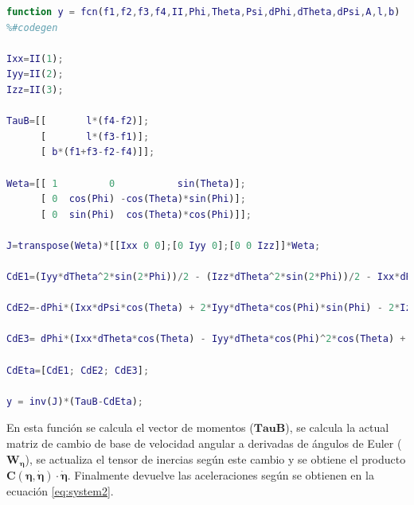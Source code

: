 \documentclass[twoside,11pt]{book}
\begin{document}
\singlespacing
\begin{lstlisting}[language=Matlab]
function y = fcn(f1,f2,f3,f4,II,Phi,Theta,Psi,dPhi,dTheta,dPsi,A,l,b)
%#codegen

Ixx=II(1);
Iyy=II(2);
Izz=II(3);
 
TauB=[[       l*(f4-f2)];
      [       l*(f3-f1)];
      [ b*(f1+f3-f2-f4)]];  

Weta=[[ 1         0           sin(Theta)];
      [ 0  cos(Phi) -cos(Theta)*sin(Phi)];
      [ 0  sin(Phi)  cos(Theta)*cos(Phi)]];
 
J=transpose(Weta)*[[Ixx 0 0];[0 Iyy 0];[0 0 Izz]]*Weta;  

CdE1=(Iyy*dTheta^2*sin(2*Phi))/2 - (Izz*dTheta^2*sin(2*Phi))/2 - Ixx*dPsi*dTheta*cos(Theta) - (Iyy*dPsi^2*sin(2*Phi)*cos(Theta)^2)/2 + (Izz*dPsi^2*sin(2*Phi)*cos(Theta)^2)/2 - Iyy*dPsi*dTheta*cos(2*Phi)*cos(Theta) + Izz*dPsi*dTheta*cos(2*Phi)*cos(Theta);

CdE2=-dPhi*(Ixx*dPsi*cos(Theta) + 2*Iyy*dTheta*cos(Phi)*sin(Phi) - 2*Izz*dTheta*cos(Phi)*sin(Phi) + Iyy*dPsi*cos(Phi)^2*cos(Theta) - Izz*dPsi*cos(Phi)^2*cos(Theta) - Iyy*dPsi*cos(Theta)*sin(Phi)^2 + Izz*dPsi*cos(Theta)*sin(Phi)^2)  - Ixx*dPsi^2*cos(Theta)*sin(Theta) + Iyy*dPsi^2*cos(Theta)*sin(Phi)^2*sin(Theta) + Izz*dPsi^2*cos(Phi)^2*cos(Theta)*sin(Theta);

CdE3= dPhi*(Ixx*dTheta*cos(Theta) - Iyy*dTheta*cos(Phi)^2*cos(Theta) + Izz*dTheta*cos(Phi)^2*cos(Theta) + Iyy*dTheta*cos(Theta)*sin(Phi)^2 - Izz*dTheta*cos(Theta)*sin(Phi)^2 + 2*Iyy*dPsi*cos(Phi)*cos(Theta)^2*sin(Phi) - 2*Izz*dPsi*cos(Phi)*cos(Theta)^2*sin(Phi)) + Iyy*dTheta^2*cos(Phi)*sin(Phi)*sin(Theta) - Izz*dTheta^2*cos(Phi)*sin(Phi)*sin(Theta) + 2*Ixx*dPsi*dTheta*cos(Theta)*sin(Theta) - 2*Izz*dPsi*dTheta*cos(Phi)^2*cos(Theta)*sin(Theta) - 2*Iyy*dPsi*dTheta*cos(Theta)*sin(Phi)^2*sin(Theta);

CdEta=[CdE1; CdE2; CdE3];

y = inv(J)*(TauB-CdEta);
\end{lstlisting}
\onehalfspacing

En esta función se calcula el vector de momentos ($\mathbf{TauB}$), se calcula la actual matriz de cambio de base de velocidad angular a derivadas de ángulos de Euler ($\pmb{W_\eta}$), se actualiza el tensor de inercias según este cambio y se obtiene el producto $\pmb{C(\eta,\dot{\eta})}\cdot\pmb{\dot{\eta}}$. Finalmente devuelve las aceleraciones según se obtienen en la ecuación \ref{eq:system2}.
\end{document}

